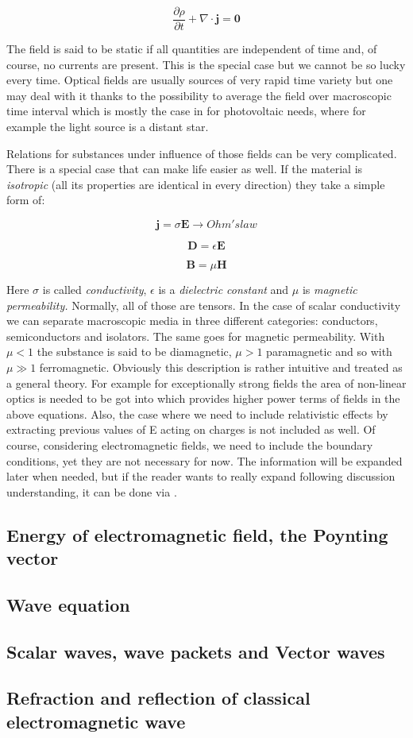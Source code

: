 \begin{equation}
\frac{\partial\rho}{\partial t} + \nabla \cdot \mathbf{j = 0}
\end{equation}

The field is said to be static if all quantities are independent of time
and, of course, no currents are present. This is the special case but we
cannot be so lucky every time. Optical fields are usually sources of
very rapid time variety but one may deal with it thanks to the
possibility to average the field over macroscopic time interval which is
mostly the case in for photovoltaic needs, where for example the light
source is a distant star.

Relations for substances under influence of those fields can be very
complicated. There is a special case that can make life easier as well.
If the material is \emph{isotropic} (all its properties are identical in
every direction) they take a simple form of:

\begin{equation}
\mathbf{j} = \sigma\mathbf{E \rightarrow} Ohm's law
\end{equation}

\begin{equation}
\mathbf{D =}\epsilon\mathbf{E}
\end{equation}

\begin{equation}
\mathbf{B =}\mu\mathbf{H}
\end{equation}

Here \(\sigma\) is called \emph{conductivity}, \(\epsilon\) is a
\emph{dielectric constant} and \(\mu\) is \emph{magnetic permeability.}
Normally, all of those are tensors. In the case of scalar conductivity
we can separate macroscopic media in three different categories:
conductors, semiconductors and isolators. The same goes for magnetic
permeability. With \(\mu < 1\) the substance is said to be diamagnetic,
\(\mu > 1\) paramagnetic and so with \(\mu \gg 1\) ferromagnetic.
Obviously this description is rather intuitive and treated as a general
theory. For example for exceptionally strong fields the area of
non-linear optics is needed to be got into which provides higher power
terms of fields in the above equations. Also, the case where we need to
include relativistic effects by extracting previous values of E acting
on charges is not included as well. Of course, considering electromagnetic fields, we need to include the boundary conditions, yet they are not necessary for now. The information will be expanded
later when needed, but if the reader wants to really expand following
discussion understanding, it can be done via \cite{Born1999} \cite{Jackson}.


\subsection{Energy of electromagnetic field, the Poynting vector}
\subsection{Wave equation}
\subsection{Scalar waves, wave packets and Vector waves}
\subsection{Refraction and reflection of classical electromagnetic wave}
